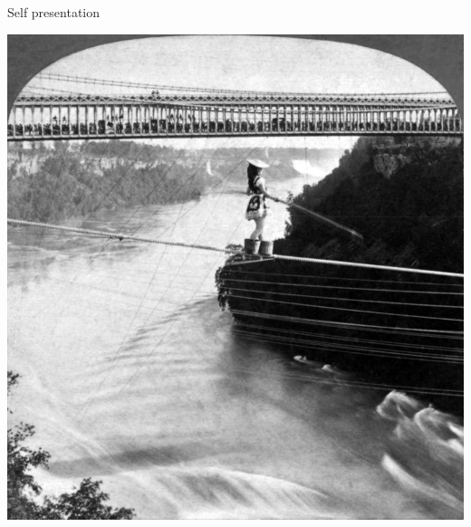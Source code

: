 \documentclass[aspectratio=169]{beamer}
\begin{document}
\begin{frame}
  \begin{center}
    \Huge Self presentation
    \\ \small \cite{sakulku11}
  \end{center}
\end{frame}

\begin{frame}
\begin{center}
    \includegraphics[scale=.2]{./assets/tightrope.jpg} \\
\end{center}
\end{frame}
\end{document}
